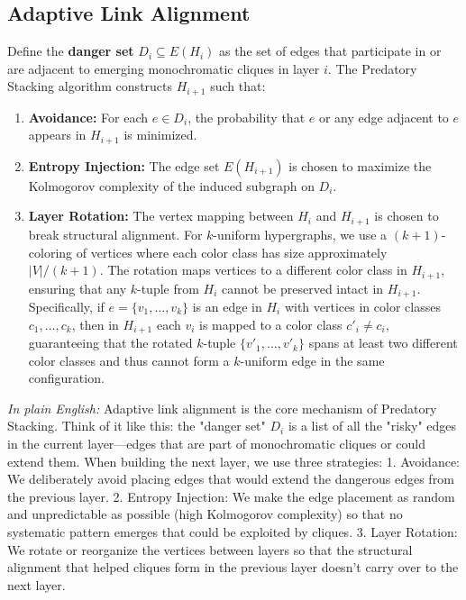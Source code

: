 \documentclass[12pt]{article}
\begin{document}
\subsection{Adaptive Link Alignment}
Define the \textbf{danger set} $D_i \subseteq E(H_i)$ as the set of edges that participate in or are adjacent to emerging monochromatic cliques in layer $i$. The Predatory Stacking algorithm constructs $H_{i+1}$ such that:

\begin{enumerate}
    \item \textbf{Avoidance:} For each $e \in D_i$, the probability that $e$ or any edge adjacent to $e$ appears in $H_{i+1}$ is minimized.
    \item \textbf{Entropy Injection:} The edge set $E(H_{i+1})$ is chosen to maximize the Kolmogorov complexity of the induced subgraph on $D_i$.
    \item \textbf{Layer Rotation:} The vertex mapping between $H_i$ and $H_{i+1}$ is chosen to break structural alignment. For $k$-uniform hypergraphs, we use a $(k+1)$-coloring of vertices where each color class has size approximately $|V|/(k+1)$. The rotation maps vertices to a different color class in $H_{i+1}$, ensuring that any $k$-tuple from $H_i$ cannot be preserved intact in $H_{i+1}$. Specifically, if $e = \{v_1, \ldots, v_k\}$ is an edge in $H_i$ with vertices in color classes $c_1, \ldots, c_k$, then in $H_{i+1}$ each $v_i$ is mapped to a color class $c'_i \neq c_i$, guaranteeing that the rotated $k$-tuple $\{v'_1, \ldots, v'_k\}$ spans at least two different color classes and thus cannot form a $k$-uniform edge in the same configuration.
\end{enumerate}

\textit{In plain English:} Adaptive link alignment is the core mechanism of Predatory Stacking. Think of it like this: the "danger set" $D_i$ is a list of all the "risky" edges in the current layer—edges that are part of monochromatic cliques or could extend them. When building the next layer, we use three strategies:
1. Avoidance: We deliberately avoid placing edges that would extend the dangerous edges from the previous layer.
2. Entropy Injection: We make the edge placement as random and unpredictable as possible (high Kolmogorov complexity) so that no systematic pattern emerges that could be exploited by cliques.
3. Layer Rotation: We rotate or reorganize the vertices between layers so that the structural alignment that helped cliques form in the previous layer doesn't carry over to the next layer.
\end{document}
